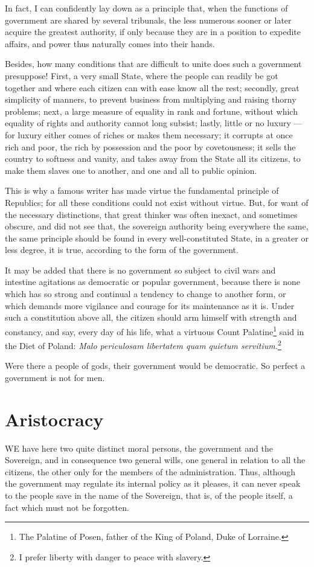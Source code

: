 \documentclass[12pt]{report}
\begin{document}
In fact, I can confidently lay down as a principle that, when the functions of government are shared by several tribunals, the less numerous sooner or later acquire the greatest authority, if only because they are in a position to expedite affairs, and power thus naturally comes into their hands.

Besides, how many conditions that are difficult to unite does such a government presuppose! First, a very small State, where the people can readily be got together and where each citizen can with ease know all the rest; secondly, great simplicity of manners, to prevent business from multiplying and raising thorny problems; next, a large measure of equality in rank and fortune, without which equality of rights and authority cannot long subsist; lastly, little or no luxury — for luxury either comes of riches or makes them necessary; it corrupts at once rich and poor, the rich by possession and the poor by covetousness; it sells the country to softness and vanity, and takes away from the State all its citizens, to make them slaves one to another, and one and all to public opinion.

This is why a famous writer has made virtue the fundamental principle of Republics; for all these conditions could not exist without virtue. But, for want of the necessary distinctions, that great thinker was often inexact, and sometimes obscure, and did not see that, the sovereign authority being everywhere the same, the same principle should be found in every well-constituted State, in a greater or less degree, it is true, according to the form of the government.

It may be added that there is no government so subject to civil wars and intestine agitations as democratic or popular government, because there is none which has so strong and continual a tendency to change to another form, or which demands more vigilance and courage for its maintenance as it is. Under such a constitution above all, the citizen should arm himself with strength and constancy, and say, every day of his life, what a virtuous Count Palatine\footnote{The Palatine of Posen, father of the King of Poland, Duke of Lorraine.} said in the Diet of Poland: \textit{Malo periculosam libertatem quam quietum servitium.}\footnote{I prefer liberty with danger to peace with slavery.}

Were there a people of gods, their government would be democratic. So perfect a government is not for men.

\section{Aristocracy}
WE have here two quite distinct moral persons, the government and the Sovereign, and in consequence two general wills, one general in relation to all the citizens, the other only for the members of the administration. Thus, although the government may regulate its internal policy as it pleases, it can never speak to the people save in the name of the Sovereign, that is, of the people itself, a fact which must not be forgotten.
\end{document}
